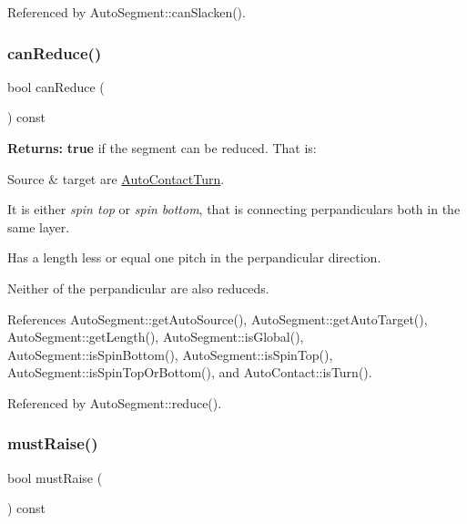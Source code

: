 Referenced by Auto\+Segment\+::can\+Slacken().

\mbox{\label{classKatabatic_1_1AutoSegment_af1a231b2324a486d4ef61b247886cdeb}} 
\subsubsection{\texorpdfstring{can\+Reduce()}{canReduce()}}
{\footnotesize\ttfamily bool can\+Reduce (\begin{DoxyParamCaption}{ }\end{DoxyParamCaption}) const}

{\bfseries Returns\+:} {\bfseries true} if the segment can be reduced. That is\+:
\begin{DoxyItemize}
\item Source \& target are \mbox{\hyperlink{classKatabatic_1_1AutoContactTurn}{Auto\+Contact\+Turn}}.
\item It is either {\itshape spin top} or {\itshape spin bottom}, that is connecting perpandiculars both in the same layer.
\item Has a length less or equal one pitch in the perpandicular direction.
\item Neither of the perpandicular are also reduceds. 
\end{DoxyItemize}

References Auto\+Segment\+::get\+Auto\+Source(), Auto\+Segment\+::get\+Auto\+Target(), Auto\+Segment\+::get\+Length(), Auto\+Segment\+::is\+Global(), Auto\+Segment\+::is\+Spin\+Bottom(), Auto\+Segment\+::is\+Spin\+Top(), Auto\+Segment\+::is\+Spin\+Top\+Or\+Bottom(), and Auto\+Contact\+::is\+Turn().



Referenced by Auto\+Segment\+::reduce().

\mbox{\label{classKatabatic_1_1AutoSegment_a449ebb156fd51b04bbc029a657b4cded}} 
\subsubsection{\texorpdfstring{must\+Raise()}{mustRaise()}}
{\footnotesize\ttfamily bool must\+Raise (\begin{DoxyParamCaption}{ }\end{DoxyParamCaption}) const}


